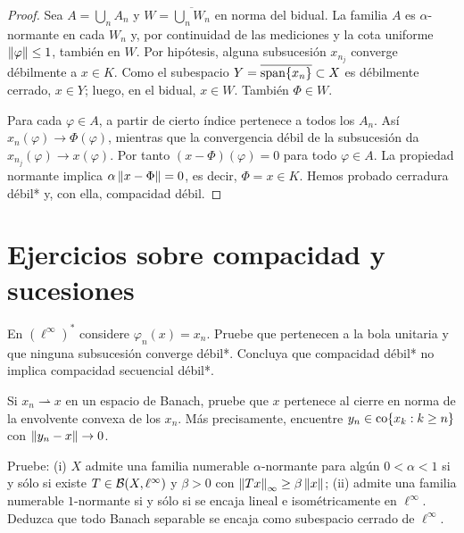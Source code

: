 \begin{proof}
Sea $A=\bigcup_nA_n$ y $W=\overline{\bigcup_nW_n}$ en norma del bidual. La familia $A$ es $\alpha$-normante en cada $W_n$ y, por continuidad de las mediciones y la cota uniforme $\left\lVert\varphi\right\rVert\leq1$, también en $W$. Por hipótesis, alguna subsucesión $x_{n_j}$ converge débilmente a $x\in K$. Como el subespacio $Y=\overline{\operatorname{span}\{x_n\}}\subset X$ es débilmente cerrado, $x\in Y$; luego, en el bidual, $x\in W$. También $\Phi\in W$.

Para cada $\varphi\in A$, a partir de cierto índice pertenece a todos los $A_n$. Así $x_n(\varphi)\to\Phi(\varphi)$, mientras que la convergencia débil de la subsucesión da $x_{n_j}(\varphi)\to x(\varphi)$. Por tanto $(x-\Phi)(\varphi)=0$ para todo $\varphi\in A$. La propiedad normante implica $\alpha\left\lVert x-\Phi\right\rVert=0$, es decir, $\Phi=x\in K$. Hemos probado cerradura débil* y, con ella, compacidad débil.
\end{proof}

\section{Ejercicios sobre compacidad y sucesiones}
\begin{ejercicio}\label{ej:v3-l17-1}
En $(\ell^\infty)^*$ considere $\varphi_n(x)=x_n$. Pruebe que pertenecen a la bola unitaria y que ninguna subsucesión converge débil*. Concluya que compacidad débil* no implica compacidad secuencial débil*.
\end{ejercicio}


\begin{ejercicio}\label{ej:v3-l17-2}\label{v3:mazur}
Si $x_n\rightharpoonup x$ en un espacio de Banach, pruebe que $x$ pertenece al cierre en norma de la envolvente convexa de los $x_n$. Más precisamente, encuentre $y_n\in\operatorname{co}\{x_k:k\geq n\}$ con $\left\lVert y_n-x\right\rVert\to0$.
\end{ejercicio}


\begin{ejercicio}\label{ej:v3-l17-3}
Pruebe: (i) $X$ admite una familia numerable $\alpha$-normante para algún $0<\alpha<1$ si y sólo si existe $T\in\mathcal B(X,\ell^\infty)$ y $\beta>0$ con $\left\lVert Tx\right\rVert_\infty\geq\beta\left\lVert x\right\rVert$; (ii) admite una familia numerable $1$-normante si y sólo si se encaja lineal e isométricamente en $\ell^\infty$. Deduzca que todo Banach separable se encaja como subespacio cerrado de $\ell^\infty$.
\end{ejercicio}


